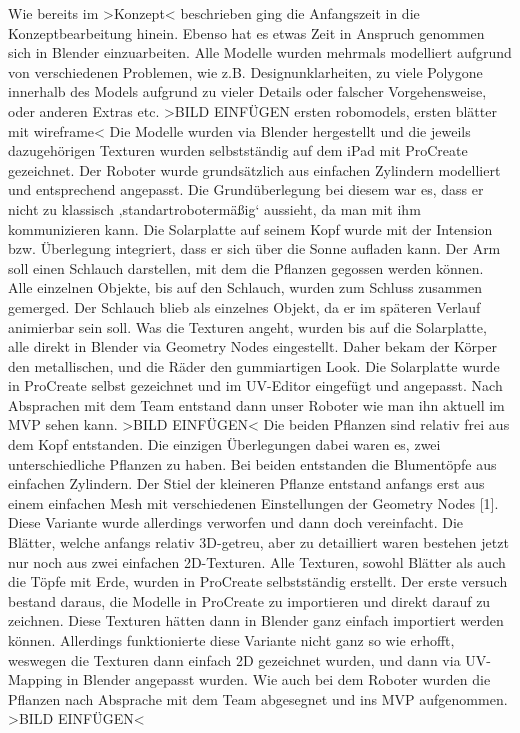 Wie bereits im >Konzept< beschrieben ging die Anfangszeit in die Konzeptbearbeitung hinein. Ebenso hat es etwas Zeit in Anspruch genommen sich in Blender einzuarbeiten. Alle Modelle wurden mehrmals modelliert aufgrund von verschiedenen Problemen, wie z.B. Designunklarheiten, zu viele Polygone innerhalb des Models aufgrund zu vieler Details oder falscher Vorgehensweise, oder anderen Extras etc. >BILD EINFÜGEN ersten robomodels, ersten blätter mit wireframe<
Die Modelle wurden via Blender hergestellt und die jeweils dazugehörigen Texturen wurden selbstständig auf dem iPad mit ProCreate gezeichnet.
Der Roboter wurde grundsätzlich aus einfachen Zylindern modelliert und entsprechend angepasst. Die Grundüberlegung bei diesem war es, dass er nicht zu klassisch ‚standartrobotermäßig‘ aussieht, da man mit ihm kommunizieren kann. Die Solarplatte auf seinem Kopf wurde mit der Intension bzw. Überlegung integriert, dass er sich über die Sonne aufladen kann. Der Arm soll einen Schlauch darstellen, mit dem die Pflanzen gegossen werden können. Alle einzelnen Objekte, bis auf den Schlauch, wurden zum Schluss zusammen gemerged. Der Schlauch blieb als einzelnes Objekt, da er im späteren Verlauf animierbar sein soll. Was die Texturen angeht, wurden bis auf die Solarplatte, alle direkt in Blender via Geometry Nodes eingestellt. Daher bekam der Körper den metallischen, und die Räder den gummiartigen Look. Die Solarplatte wurde in ProCreate selbst gezeichnet und im UV-Editor eingefügt und angepasst. Nach Absprachen mit dem Team entstand dann unser Roboter wie man ihn aktuell im MVP sehen kann. >BILD EINFÜGEN<
Die beiden Pflanzen sind relativ frei aus dem Kopf entstanden. Die einzigen Überlegungen dabei waren es, zwei unterschiedliche Pflanzen zu haben. Bei beiden entstanden die Blumentöpfe aus einfachen Zylindern. Der Stiel der kleineren Pflanze entstand anfangs erst aus einem einfachen Mesh mit verschiedenen Einstellungen der Geometry Nodes [1]. Diese Variante wurde allerdings verworfen und dann doch vereinfacht. Die Blätter, welche anfangs relativ 3D-getreu, aber zu detailliert waren bestehen jetzt nur noch aus zwei einfachen 2D-Texturen. Alle Texturen, sowohl Blätter als auch die Töpfe mit Erde, wurden in ProCreate selbstständig erstellt. Der erste versuch bestand daraus, die Modelle in ProCreate zu importieren und direkt darauf zu zeichnen. Diese Texturen hätten dann in Blender ganz einfach importiert werden können. Allerdings funktionierte diese Variante nicht ganz so wie erhofft, weswegen die Texturen dann einfach 2D gezeichnet wurden, und dann via UV-Mapping in Blender angepasst wurden. Wie auch bei dem Roboter wurden die Pflanzen nach Absprache mit dem Team abgesegnet und ins MVP aufgenommen. >BILD EINFÜGEN<
